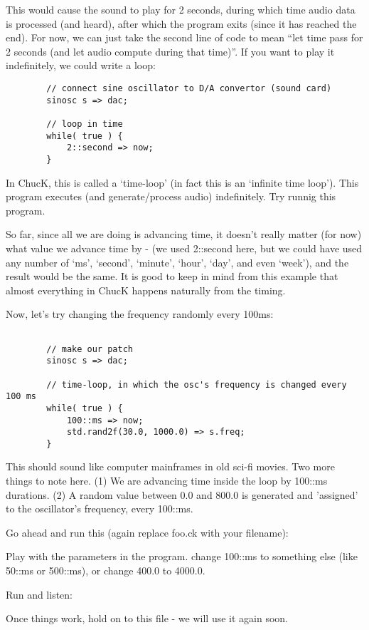 
This would cause the sound to play for 2 seconds, during which time audio data is processed (and heard), after which the program exits (since it has reached the end). For now, we can just take the second line of code to mean ``let time pass for 2 seconds (and let audio compute during that time)''. If you want to play it indefinitely, we could write a loop:

\begin{verbatim}
        // connect sine oscillator to D/A convertor (sound card)
        sinosc s => dac;

        // loop in time
        while( true ) {
            2::second => now;
        }
\end{verbatim}

In ChucK, this is called a `time-loop' (in fact this is an `infinite time loop'). This program executes (and generate/process audio) indefinitely. Try runnig this program. 

So far, since all we are doing is advancing time, it doesn't really matter (for now) what value we advance time by - (we used 2::second here, but we could have used any number of `ms', `second', `minute', `hour', `day', and even `week'), and the result would be the same. It is good to keep in mind from this example that almost everything in ChucK happens naturally from the timing. 

Now, let's try changing the frequency randomly every 100ms:
\begin{verbatim}

        // make our patch
        sinosc s => dac;

        // time-loop, in which the osc's frequency is changed every 100 ms
        while( true ) {
            100::ms => now;
            std.rand2f(30.0, 1000.0) => s.freq;
        }
\end{verbatim}

This should sound like computer mainframes in old sci-fi movies. Two more things to note here. (1) We are advancing time inside the loop by 100::ms durations. (2) A random value between 0.0 and 800.0 is generated and 'assigned' to the oscillator's frequency, every 100::ms. 

Go ahead and run this (again replace foo.ck with your filename):

Play with the parameters in the program. change 100::ms to something else (like 50::ms or 500::ms), or change 400.0 to 4000.0. 

Run and listen:

Once things work, hold on to this file - we will use it again soon. 
